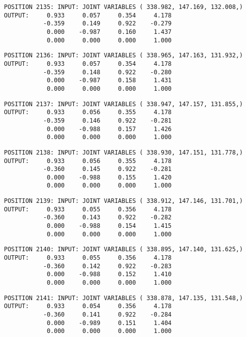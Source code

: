 \begin{verbatim}
POSITION 2135: INPUT: JOINT VARIABLES ( 338.982, 147.169, 132.008,)
OUTPUT:     0.933     0.057     0.354     4.178
           -0.359     0.149     0.922    -0.279
            0.000    -0.987     0.160     1.437
            0.000     0.000     0.000     1.000
\end{verbatim} \pagebreak[1]\begin{verbatim}
POSITION 2136: INPUT: JOINT VARIABLES ( 338.965, 147.163, 131.932,)
OUTPUT:     0.933     0.057     0.354     4.178
           -0.359     0.148     0.922    -0.280
            0.000    -0.987     0.158     1.431
            0.000     0.000     0.000     1.000
\end{verbatim} \pagebreak[1]\begin{verbatim}
POSITION 2137: INPUT: JOINT VARIABLES ( 338.947, 147.157, 131.855,)
OUTPUT:     0.933     0.056     0.355     4.178
           -0.359     0.146     0.922    -0.281
            0.000    -0.988     0.157     1.426
            0.000     0.000     0.000     1.000
\end{verbatim} \pagebreak[1]\begin{verbatim}
POSITION 2138: INPUT: JOINT VARIABLES ( 338.930, 147.151, 131.778,)
OUTPUT:     0.933     0.056     0.355     4.178
           -0.360     0.145     0.922    -0.281
            0.000    -0.988     0.155     1.420
            0.000     0.000     0.000     1.000
\end{verbatim} \pagebreak[1]\begin{verbatim}
POSITION 2139: INPUT: JOINT VARIABLES ( 338.912, 147.146, 131.701,)
OUTPUT:     0.933     0.055     0.356     4.178
           -0.360     0.143     0.922    -0.282
            0.000    -0.988     0.154     1.415
            0.000     0.000     0.000     1.000
\end{verbatim} \pagebreak[1]\begin{verbatim}
POSITION 2140: INPUT: JOINT VARIABLES ( 338.895, 147.140, 131.625,)
OUTPUT:     0.933     0.055     0.356     4.178
           -0.360     0.142     0.922    -0.283
            0.000    -0.988     0.152     1.410
            0.000     0.000     0.000     1.000
\end{verbatim} \pagebreak[1]\begin{verbatim}
POSITION 2141: INPUT: JOINT VARIABLES ( 338.878, 147.135, 131.548,)
OUTPUT:     0.933     0.054     0.356     4.178
           -0.360     0.141     0.922    -0.284
            0.000    -0.989     0.151     1.404
            0.000     0.000     0.000     1.000
\end{verbatim} \pagebreak[1]\begin{verbatim}

\end{verbatim}
